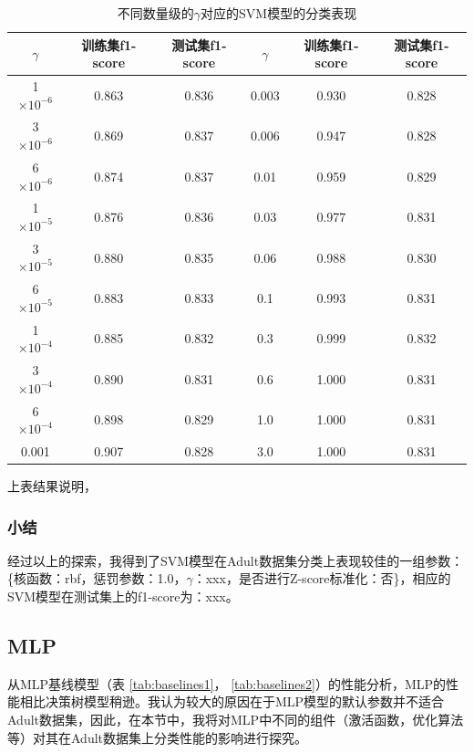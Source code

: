 \documentclass[12pt,a4paper]{article}
\theoremstyle{definition}
\begin{document}
\begin{table}[H]
	\renewcommand\arraystretch{1.35}
	\caption{不同数量级的$\gamma$对应的SVM模型的分类表现}
	\label{tab:gammma}
	\centering
	
	\begin{tabular}{c|c|c||c|c|c}
		\centering
		$\gamma$ & 训练集f1-score & 测试集f1-score & $\gamma$ & 训练集f1-score & 测试集f1-score \\
		\hline
		\hline
		
		1 $\times 10^{-6}$  & 0.863 & 0.836 & 0.003 & 0.930 & 0.828 \\
		3 $\times 10^{-6}$ & 0.869 & 0.837 & 0.006 & 0.947 & 0.828 \\
		6 $\times 10^{-6}$ & 0.874 & 0.837 & 0.01 & 0.959 & 0.829 \\
		1 $\times 10^{-5}$  & 0.876 & 0.836 & 0.03 & 0.977 & 0.831 \\
		3 $\times 10^{-5}$ & 0.880 & 0.835 & 0.06 & 0.988 & 0.830 \\
		6 $\times 10^{-5}$ & 0.883 & 0.833 & 0.1 & 0.993 & 0.831 \\
		1 $\times 10^{-4}$ & 0.885 & 0.832 & 0.3 & 0.999 & 0.832 \\
		3 $\times 10^{-4}$ & 0.890 & 0.831 & 0.6 & 1.000 & 0.831 \\
		6 $\times 10^{-4}$ & 0.898 & 0.829 & 1.0 & 1.000 & 0.831 \\
		0.001 & 0.907 & 0.828 & 3.0 & 1.000 & 0.831 \\

	\end{tabular}
\end{table}

上表结果说明，

\subsubsection{小结}

经过以上的探索，我得到了SVM模型在Adult数据集分类上表现较佳的一组参数：\{核函数：rbf，惩罚参数：1.0，$\gamma$：xxx，是否进行Z-score标准化：否\}，相应的SVM模型在测试集上的f1-score为：xxx。

\subsection{MLP}

从MLP基线模型（表 \ref{tab:baselines1}， \ref{tab:baselines2}）的性能分析，MLP的性能相比决策树模型稍逊。我认为较大的原因在于MLP模型的默认参数并不适合Adult数据集，因此，在本节中，我将对MLP中不同的组件（激活函数，优化算法等）对其在Adult数据集上分类性能的影响进行探究。
\end{document}
